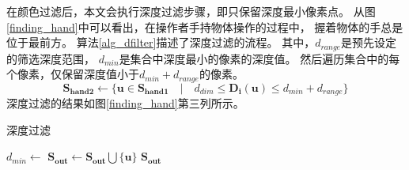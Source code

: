在颜色过滤后，本文会执行深度过滤步骤，即只保留深度最小像素点。
从图\ref{finding_hand}中可以看出，在操作者手持物体操作的过程中，
握着物体的手总是位于最前方。
算法\ref{alg_dfilter}描述了深度过滤的流程。
其中，$d_{range}$是预先设定的筛选深度范围，%
$d_{min}$是集合中深度最小的像素的深度值。
然后遍历集合中的每个像素，仅保留深度值小于$d_{min}+d_{range}$的像素。
\begin{equation}
    \bm{S_{hand2}} \gets
    \{
    \bm{u} \in \bm{S_{hand1}} \quad
    | \quad
    d_{dim} \leq \bm{D_i}(\bm{u}) \leq d_{min} + d_{range}
    \}
\end{equation}
深度过滤的结果如图\ref{finding_hand}第三列所示。
\begin{algorithm}
    \caption{深度过滤}
    \label{alg_dfilter}
    \begin{algorithmic}[1]
            \State $d_{min} \gets$ 
                    \State $\bm{S_{out}} \gets \bm{S_{out}} \bigcup \{\bm{u}\}$
                \EndIf
            \EndFor
            \State \Return $\bm{S_{out}}$
        \EndFunction
    \end{algorithmic}
\end{algorithm}
